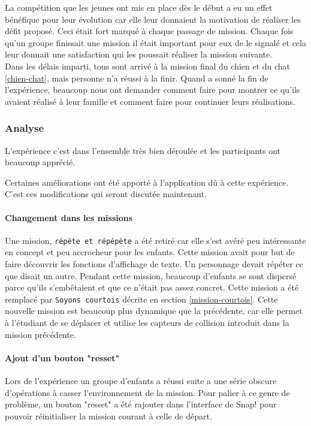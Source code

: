 La compétition que les jeunes ont mis en place dès le début a eu un effet bénéfique pour leur évolution car elle leur donnaient la motivation de réaliser les défit proposé. Ceci était fort marqué à chaque passage de mission. Chaque fois qu'un groupe finissait une mission il était important pour eux de le signalé et cela leur donnait une satisfaction qui les poussait réaliser la mission suivante.\\ %

Dans les délais imparti, tous sont arrivé à la mission final du chien et du chat \ref{chien-chat}, mais personne n'a réussi à la finir. Quand a sonné la fin de l'expérience, beaucoup nous ont demander comment faire pour montrer ce qu'ils avaient réalisé à leur famille et comment faire pour continuer leurs réalisations.

\subsubsection{Analyse}
\label{analyse-kidscode}
L'expérience c'est dans l'ensemble très bien déroulée et les participants ont beaucoup apprécié.

Certaines améliorations ont été apporté à l'application dû à cette expérience. C'est ces modifications qui seront discutée maintenant.

\paragraph{Changement dans les missions}
Une mission, \texttt{répète et répépète} a été retiré car elle s'est avéré peu intéressante en concept et peu accrocheur pour les enfants. Cette mission avait pour but de faire découvrir les fonctions d'affichage de texte. Un personnage devait répéter ce que disait un autre. Pendant cette mission, beaucoup d'enfants se sont dispersé parce qu'ils s'embêtaient et que ce n'était pas assez concret. Cette mission a été remplacé par \texttt{Soyons courtois} décrite en section \ref{mission-courtois}. Cette nouvelle mission est beaucoup plus dynamique que la précédente, car elle permet à l'étudiant de se déplacer et utilise les capteurs de collision introduit dans la mission précédente.

\paragraph{Ajout d'un bouton "resset"}
Lors de l'expérience un groupe d'enfants a réussi suite a une série obscure d'opérations à casser l'environnement de la mission. Pour palier à ce genre de problème, un bouton "resset" a été rajouter dans l'interface de Snap! pour pouvoir réinitialiser la mission courant à celle de départ.

